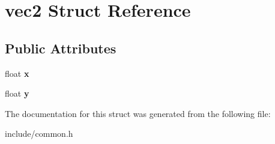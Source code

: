 \hypertarget{structvec2}{}\section{vec2 Struct Reference}
\label{structvec2}
\subsection*{Public Attributes}
\begin{DoxyCompactItemize}
\item 
\hypertarget{structvec2_a002d3519d48fe3cd79729b5b0ded74bf}{}float {\bfseries x}\label{structvec2_a002d3519d48fe3cd79729b5b0ded74bf}

\item 
\hypertarget{structvec2_a6d28b12b511da692550fc9d37b4e9b1d}{}float {\bfseries y}\label{structvec2_a6d28b12b511da692550fc9d37b4e9b1d}

\end{DoxyCompactItemize}


The documentation for this struct was generated from the following file\+:\begin{DoxyCompactItemize}
\item 
include/common.\+h\end{DoxyCompactItemize}
